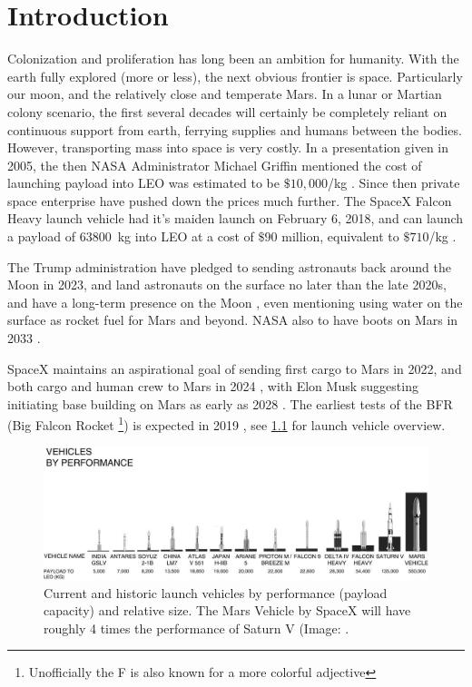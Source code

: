 
\chapter{Introduction}
Colonization and proliferation has long been an ambition for humanity. With the earth fully explored (more or less), the next obvious frontier is space. Particularly our moon, and the relatively close and temperate Mars. In a lunar or Martian colony scenario, the first several decades will certainly be completely reliant on continuous support from earth, ferrying supplies and humans between the bodies. However, transporting mass into space is very costly. In a presentation given in 2005, the then NASA Administrator Michael Griffin mentioned the cost of launching payload into LEO was estimated to be $\$10,000$/kg \cite[p.~344]{Rapp2016}. Since then private space enterprise have pushed down the prices much further. The SpaceX Falcon Heavy launch vehicle had it's maiden launch on February 6, 2018, and can launch a payload of \SI{63800}{\kg} into LEO at a cost of $\$90$ million, equivalent to $\$710$/kg \cite{SpaceX}.

The Trump administration have pledged to sending astronauts back around the Moon in 2023, and land astronauts on the surface no later than the late 2020s, and have a long-term presence on the Moon \cite{NASA2018}, even mentioning using water on the surface as rocket fuel for Mars and beyond. NASA also to have boots on Mars in 2033 \cite{Mack}.

SpaceX maintains an aspirational goal of sending first cargo to Mars in 2022, and both cargo and human crew to Mars in 2024 \cite{SpaceXa}, with Elon Musk suggesting initiating base building on Mars as early as 2028 \cite{Williams}. The earliest tests of the BFR (Big Falcon Rocket \footnote{Unofficially the F is also known for a more colorful adjective}) is expected in 2019 \cite{SpaceXa}, see \cref{fig:musk-launch-vehicles} for launch vehicle overview.

\begin{figure}[ht]
	\centering
	\includegraphics[width=0.90\linewidth]{fig/musk-launch-vehicles.jpg}
	\caption{Current and historic launch vehicles by performance (payload capacity) and relative size. The Mars Vehicle by SpaceX will have roughly 4 times the performance of Saturn V (Image: \cite{Musk}.}
	\label{fig:musk-launch-vehicles}
\end{figure}

